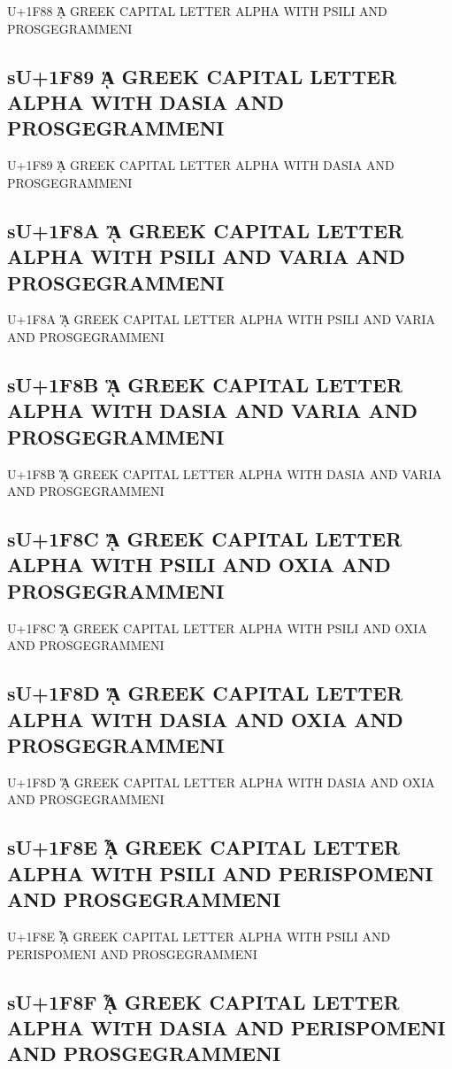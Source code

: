 U+1F88 ᾈ GREEK CAPITAL LETTER ALPHA WITH PSILI AND PROSGEGRAMMENI

\subsection{sU+1F89 ᾉ GREEK CAPITAL LETTER ALPHA WITH DASIA AND PROSGEGRAMMENI}

U+1F89 ᾉ GREEK CAPITAL LETTER ALPHA WITH DASIA AND PROSGEGRAMMENI

\subsection{sU+1F8A ᾊ GREEK CAPITAL LETTER ALPHA WITH PSILI AND VARIA AND PROSGEGRAMMENI}

U+1F8A ᾊ GREEK CAPITAL LETTER ALPHA WITH PSILI AND VARIA AND PROSGEGRAMMENI

\subsection{sU+1F8B ᾋ GREEK CAPITAL LETTER ALPHA WITH DASIA AND VARIA AND PROSGEGRAMMENI}

U+1F8B ᾋ GREEK CAPITAL LETTER ALPHA WITH DASIA AND VARIA AND PROSGEGRAMMENI

\subsection{sU+1F8C ᾌ GREEK CAPITAL LETTER ALPHA WITH PSILI AND OXIA AND PROSGEGRAMMENI}

U+1F8C ᾌ GREEK CAPITAL LETTER ALPHA WITH PSILI AND OXIA AND PROSGEGRAMMENI

\subsection{sU+1F8D ᾍ GREEK CAPITAL LETTER ALPHA WITH DASIA AND OXIA AND PROSGEGRAMMENI}

U+1F8D ᾍ GREEK CAPITAL LETTER ALPHA WITH DASIA AND OXIA AND PROSGEGRAMMENI

\subsection{sU+1F8E ᾎ GREEK CAPITAL LETTER ALPHA WITH PSILI AND PERISPOMENI AND PROSGEGRAMMENI}

U+1F8E ᾎ GREEK CAPITAL LETTER ALPHA WITH PSILI AND PERISPOMENI AND PROSGEGRAMMENI

\subsection{sU+1F8F ᾏ GREEK CAPITAL LETTER ALPHA WITH DASIA AND PERISPOMENI AND PROSGEGRAMMENI}

